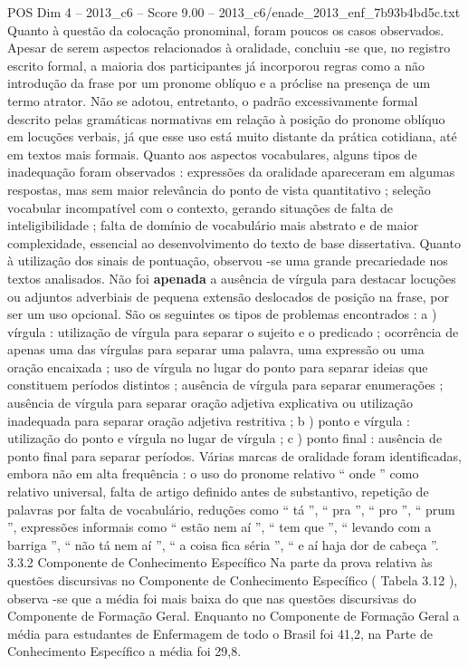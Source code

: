 \begin{textsample}{POS Dim 4 – 2013\_c6 – Score 9.00 – 2013\_c6/enade\_2013\_enf\_7b93b4bd5c.txt}
Quanto à questão da colocação pronominal, foram poucos os casos observados.
Apesar de serem aspectos relacionados à oralidade, concluiu -se que, no registro escrito formal, a maioria dos participantes já incorporou regras como a não introdução da frase por um pronome oblíquo e a próclise na presença de um termo atrator.
Não se adotou, entretanto, o padrão excessivamente formal descrito pelas gramáticas normativas em relação à posição do pronome oblíquo em locuções verbais, já que esse uso está muito distante da prática cotidiana, até em textos mais formais.
Quanto aos aspectos vocabulares, alguns tipos de inadequação foram observados : expressões da oralidade apareceram em algumas respostas, mas sem maior relevância do ponto de vista quantitativo ; seleção vocabular incompatível com o contexto, gerando situações de falta de inteligibilidade ; falta de domínio de vocabulário mais abstrato e de maior complexidade, essencial ao desenvolvimento do texto de base dissertativa.
Quanto à utilização dos sinais de pontuação, observou -se uma grande precariedade nos textos analisados.
Não foi \textbf{apenada} a ausência de vírgula para destacar locuções ou adjuntos adverbiais de pequena extensão deslocados de posição na frase, por ser um uso opcional.
São os seguintes os tipos de problemas encontrados : a ) vírgula : utilização de vírgula para separar o sujeito e o predicado ; ocorrência de apenas uma das vírgulas para separar uma palavra, uma expressão ou uma oração encaixada ; uso de vírgula no lugar do ponto para separar ideias que constituem períodos distintos ; ausência de vírgula para separar enumerações ; ausência de vírgula para separar oração adjetiva explicativa ou utilização inadequada para separar oração adjetiva restritiva ; b ) ponto e vírgula : utilização do ponto e vírgula no lugar de vírgula ; c ) ponto final : ausência de ponto final para separar períodos.
Várias marcas de oralidade foram identificadas, embora não em alta frequência : o uso do pronome relativo “ onde ” como relativo universal, falta de artigo definido antes de substantivo, repetição de palavras por falta de vocabulário, reduções como “ tá ”, “ pra ”, “ pro ”, “ prum ”, expressões informais como “ estão nem aí ”, “ tem que ”, “ levando com a barriga ”, “ não tá nem aí ”, “ a coisa fica séria ”, “ e aí haja dor de cabeça ”. 3.3.2 Componente de Conhecimento Específico Na parte da prova relativa às questões discursivas no Componente de Conhecimento Específico ( Tabela 3.12 ), observa -se que a média foi mais baixa do que nas questões discursivas do Componente de Formação Geral.
Enquanto no Componente de Formação Geral a média para estudantes de Enfermagem de todo o Brasil foi 41,2, na Parte de Conhecimento Específico a média foi 29,8.

\end{textsample}
